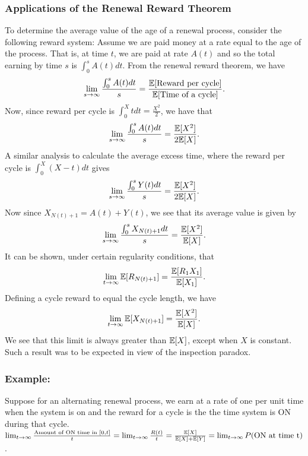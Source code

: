 \documentclass[a4paper,10pt,english]{article}
\begin{document}
\subsubsection{Applications of the Renewal Reward Theorem}
To determine the average value of the age of a renewal process, consider the following reward system: Assume we are paid money at a rate equal to the age of the process. That is, at time $t$, we are paid at rate $A(t)$ and so the total earning by time $s$ is $\int_0^s A(t)dt.$ From the renewal reward theorem, we have 
\begin{align*}
\lim_{s\to \infty}\frac{\int_0^s A(t)dt}{s} = \frac{\mathbb{E}[\text{Reward per cycle}]}{\mathbb{E}[\text{Time of a cycle}]}.
\end{align*}
Now, since reward per cycle is $\int_0^X t dt = \frac{X^2}{2}$, we have that
\begin{align*}
\lim_{s\to \infty}\frac{\int_0^s A(t)dt}{s} = \frac{\mathbb{E}[X^2]}{2\mathbb{E}[X]}.
\end{align*}
A similar analysis to calculate the average excess time, where the reward per cycle is $\int_0^X (X-t)dt$ gives 
\begin{align*}
\lim_{s\to \infty}\frac{\int_0^s Y(t)dt}{s} = \frac{\mathbb{E}[X^2]}{2\mathbb{E}[X]}.
\end{align*}
Now since $X_{N(t)+1}=A(t)+Y(t)$, we see that its average value is given by
\begin{align*}
\lim_{s\to \infty}\frac{\int_0^s X_{N(t)+1}dt}{s} = \frac{\mathbb{E}[X^2]}{\mathbb{E}[X]}.
\end{align*}
It can be shown, under certain regularity conditions, that 
\begin{align*}
\lim_{t\to \infty} \mathbb{E}[R_{N(t)+1}] = \frac{\mathbb{E}[R_1 X_1]}{\mathbb{E}[X_1]}.
\end{align*}
Defining a cycle reward to equal the cycle length, we have 
\begin{align*}
\lim_{t\to \infty} \mathbb{E}[X_{N(t)+1}] = \frac{\mathbb{E}[X^2]}{\mathbb{E}[X]}.
\end{align*}
We see that this limit is always greater than $\mathbb{E}[X]$, except when $X$ is constant. Such a result was to be expected in view of the inspection paradox.

 
 \subsubsection{Example:} Suppose for an alternating renewal process, we earn at a rate of one per unit time  when the system is on and the reward for a cycle is the the time system is ON during that cycle.\\
 $ \lim_{t \rightarrow \infty} \frac{\text{Amount of ON time in } [0,t]}{t} = \lim_{t \rightarrow \infty} \frac{R(t)}{t}=\frac{\mathbb{E}[X]}{\mathbb{E}[X]+\mathbb{E}[Y]} = \lim_{t \rightarrow \infty}P(\text{ON at time t})$. 
\end{document}
